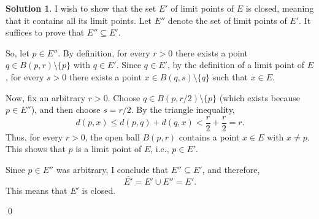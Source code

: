 \documentclass[12pt,oneside]{article}
\theoremstyle{definition}
\newtheorem{solution}{Solution}
\begin{document}
\begin{solution}
I wish to show that the set \( E' \) of limit points of \( E \) is closed, meaning that it contains all its limit points. Let \( E'' \) denote the set of limit points of \( E' \). It suffices to prove that \( E'' \subseteq E' \).

So, let \( p \in E'' \). By definition, for every \( r > 0 \) there exists a point \( q \in B(p,r) \setminus \{p\} \) with \( q \in E' \). Since \( q \in E' \), by the definition of a limit point of \( E \), for every \( s > 0 \) there exists a point \( x \in B(q,s) \setminus \{q\} \) such that \( x \in E \). 

Now, fix an arbitrary \( r > 0 \). Choose \( q \in B(p, r/2) \setminus \{p\} \) (which exists because \( p \in E'' \)), and then choose \( s = r/2 \). By the triangle inequality,
\[
d(p,x) \le d(p,q) + d(q,x) < \frac{r}{2} + \frac{r}{2} = r.
\]
Thus, for every \( r > 0 \), the open ball \( B(p,r) \) contains a point \( x \in E \) with \( x \neq p \). This shows that \( p \) is a limit point of \( E \), i.e., \( p \in E' \).

Since \( p \in E'' \) was arbitrary, I conclude that \( E'' \subseteq E' \), and therefore,
\[
\overline{E'} = E' \cup E'' = E'.
\]
This means that \( E' \) is closed.

\qed
\end{solution}
\end{document}
